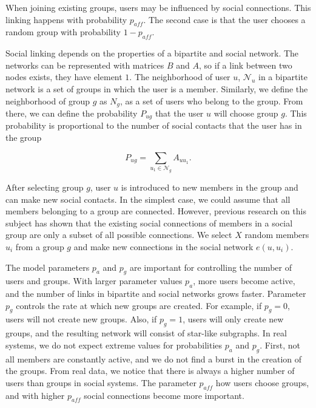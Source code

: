 When joining existing groups, users may be influenced by social connections. This linking happens with probability $p_{aff}$. The second case is that the user chooses a random group with probability $1-p_{aff}$. 

Social linking depends on the properties of a bipartite and social network. The networks can be represented with matrices $B$ and $A$, so if a link between two nodes exists, they have element $1$. The neighborhood of user $u$, $\mathcal{N}_{u}$ in a bipartite network is a set of groups in which the user is a member. Similarly, we define the neighborhood of group $g$ as $N_g$, as a set of users who belong to the group. From there, we can define the probability $ P_{ug}$ that the user $u$ will choose group $g$. This probability is proportional to the number of social contacts that the user has in the group 

\begin{equation}
P_{ug}=\sum_{u_{1}\in \mathcal{N}_{g}} A_{uu_{1}}.
\label{eq1}
\end{equation}

After selecting group $g$, user $u$ is introduced to new members in the group and can make new social contacts. In the simplest case, we could assume that all members belonging to a group are connected. However, previous research on this subject \cite{ smiljanic2017associative, backstrom2006group, zheleva2009co} has shown that the existing social connections of members in a social group are only a subset of all possible connections. We select $X$ random members $u_i$ from a group $g$ and make new connections in the social network $e(u, u_i)$. 

The model parameters $p_a$ and $p_g$ are important for controlling the number of users and groups. With larger parameter values $p_a$, more users become active, and the number of links in bipartite and social networks grows faster. Parameter $p_g$ controls the rate at which new groups are created. For example, if $p_g=0$, users will not create new groups. Also, if $p_g=1$, users will only create new groups, and the resulting network will consist of star-like subgraphs. In real systems, we do not expect extreme values for probabilities $p_a$ and $p_g$. First, not all members are constantly active, and we do not find a burst in the creation of the groups. From real data, we notice that there is always a higher number of users than groups in social systems. The parameter $p_{aff}$ how users choose groups, and with higher $p_{aff}$ social connections become more important. 


